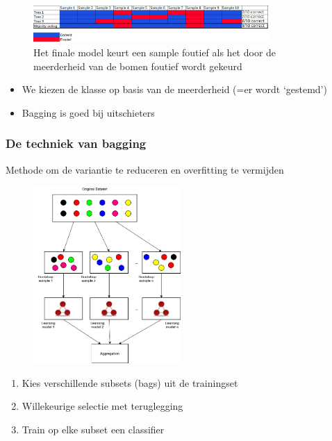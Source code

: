 \documentclass{article}
\begin{document}
\begin{figure}[H]
    \centering
    \includegraphics[width=0.8\textwidth]{bagging-majority-voting.png}
    \caption{Het finale model keurt een sample foutief als het door de meerderheid van de bomen foutief wordt gekeurd}
\end{figure}

\begin{itemize}
    \item We kiezen de klasse op basis van de meerderheid (=er wordt `gestemd')
    \item Bagging is goed bij uitschieters
\end{itemize}

\subsubsection{De techniek van bagging}

Methode om de variantie te reduceren en overfitting te vermijden

\begin{figure}[H]
    \centering
    \includegraphics[width=0.5\textwidth]{bagging-techniek.png}
\end{figure}

\begin{enumerate}
    \item Kies verschillende subsets (bags) uit de trainingset
    \item Willekeurige selectie met teruglegging
    \item Train op elke subset een classifier
\end{enumerate}
\end{document}
